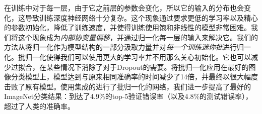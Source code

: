 \documentclass[../main.tex]{subfile}
\begin{document}
在训练中对于每一层，由于它之前层的参数会变化，所以它的输入的分布也会变化，这导致训练深度神经网络十分复杂。这个现象通过要求更低的学习率以及精心的参数初始化，降低了训练速度，并使得训练使用饱和非线性的模型非常困难。我们将这个现象成为\textit{内部协变量偏移}，并通过归一化每一层的输入来解决它。我们的方法从将归一化作为模型结构的一部分汲取力量并对\textit{每一个训练迷你批}进行归一化。批归一化使得我们可以使用更大的学习率并不用那么关心初始化。它也可以减少过拟合，在某些情况下消除了对于Dropout的需要。将批归一化应用在最好的图像分类模型上，模型达到与原来相同准确率的时间减少了14倍，并最终以很大幅度击败了原有模型。使用集成的进行了批归一化的网络，我们进一步提高了最好的ImageNet分类结果：到达了4.9\%的top-5验证错误率（以及4.8\%的测试错误率），超过了人类的准确率。
\end{document}
